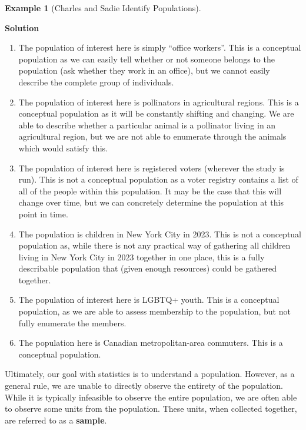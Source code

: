 \documentclass[
  letterpaper,
  DIV=11,
  numbers=noendperiod]{scrreprt}
\providecommand{\tightlist}{%
  \setlength{\itemsep}{0pt}\setlength{\parskip}{0pt}}\usepackage{longtable,booktabs,array}
\theoremstyle{definition}
\theoremstyle{definition}
\newtheorem{example}{Example}[chapter]
\theoremstyle{definition}
\theoremstyle{remark}
\begin{document}
\begin{example}[Charles and Sadie Identify
Populations]
\begin{tcolorbox}[enhanced jigsaw, colback=white, colframe=quarto-callout-color-frame, arc=.35mm, leftrule=.75mm, rightrule=.15mm, opacityback=0, breakable, bottomrule=.15mm, left=2mm, toprule=.15mm]
\vspace{-3mm}\textbf{Solution}\vspace{3mm}

\begin{enumerate}
\def\labelenumi{\alph{enumi}.}
\tightlist
\item
  The population of interest here is simply ``office workers''. This is
  a conceptual population as we can easily tell whether or not someone
  belongs to the population (ask whether they work in an office), but we
  cannot easily describe the complete group of individuals.
\item
  The population of interest here is pollinators in agricultural
  regions. This is a conceptual population as it will be constantly
  shifting and changing. We are able to describe whether a particular
  animal is a pollinator living in an agricultural region, but we are
  not able to enumerate through the animals which would satisfy this.
\item
  The population of interest here is registered voters (wherever the
  study is run). This is not a conceptual population as a voter registry
  contains a list of all of the people within this population. It may be
  the case that this will change over time, but we can concretely
  determine the population at this point in time.
\item
  The population is children in New York City in 2023. This is not a
  conceptual population as, while there is not any practical way of
  gathering all children living in New York City in 2023 together in one
  place, this is a fully describable population that (given enough
  resources) could be gathered together.
\item
  The population of interest here is LGBTQ+ youth. This is a conceptual
  population, as we are able to assess membership to the population, but
  not fully enumerate the members.
\item
  The population here is Canadian metropolitan-area commuters. This is a
  conceptual population.
\end{enumerate}

\end{tcolorbox}

\end{example}

Ultimately, our goal with statistics is to understand a population.
However, as a general rule, we are unable to directly observe the
entirety of the population. While it is typically infeasible to observe
the entire population, we are often able to observe some units from the
population. These units, when collected together, are referred to as a
\textbf{sample}.
\end{document}
